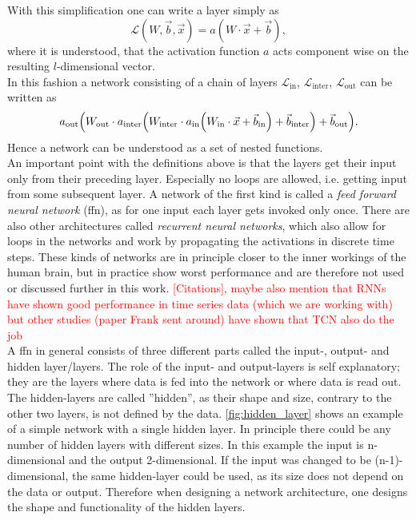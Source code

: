 \noindent With this simplification one can write a layer simply as
\begin{equation}
\mathcal{L}(W,\vec{b},\vec{x})=a(W\cdot\vec{x}+\vec{b}),
\end{equation}
where it is understood, that the activation function $a$ acts component wise on the resulting $l$-dimensional vector.\\
In this fashion a network consisting of a chain of layers $\mathcal{L}_\text{in}$, $\mathcal{L}_\text{inter}$, $\mathcal{L}_\text{out}$ can be written as
\begin{equation}
a_\text{out}{\left( W_\text{out}\cdot a_\text{inter}{\left( W_\text{inter}\cdot a_\text{in}{\left( W_\text{in}\cdot \vec{x}+\vec{b}_\text{in} \right)}+\vec{b}_\text{inter} \right)}+\vec{b}_\text{out} \right)}.
\end{equation}
Hence a network can be understood as a set of nested functions.\\
An important point with the definitions above is that the layers get their input only from their preceding layer. Especially no loops are allowed, i.e. getting input from some subsequent layer. A network of the first kind is called a \emph{feed forward neural network} (\gls{ffn}), as for one input each layer gets invoked only once. There are also other architectures called \emph{recurrent neural networks}, which also allow for loops in the networks and work by propagating the activations in discrete time steps. These kinds of networks are in principle closer to the inner workings of the human brain, but in practice show worst performance and are therefore not used or discussed further in this work. \textcolor{red}{[Citations], maybe also mention that RNNs have shown good performance in time series data (which we are working with) but other studies (paper Frank sent around) have shown that TCN also do the job}\\
A \gls{ffn} in general consists of three different parts called the input-, output- and hidden layer/layers. The role of the input- and output-layers is self explanatory; they are the layers where data is fed into the network or where data is read out. The hidden-layers are called ''hidden'', as their shape and size, contrary to the other two layers, is not defined by the data. \autoref{fig:hidden_layer} shows an example of a simple network with a single hidden layer. In principle there could be any number of hidden layers with different sizes. In this example the input is n-dimensional and the output 2-dimensional. If the input was changed to be (n-1)-dimensional, the same hidden-layer could be used, as its size does not depend on the data or output. Therefore when designing a network architecture, one designs the shape and functionality of the hidden layers.\\
